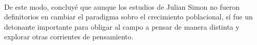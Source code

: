 \documentclass[11pt,spanish,letterpaper]{article}
\theoremstyle{plain}
\begin{document}
\\
De este modo, \cite{ahlburg1998julian} concluy\'e que aunque los estudios de Julian Simon no fueron definitorios en cambiar el paradigma sobro el crecimiento poblacional, s\'i fue un detonante importante para obligar al campo a pensar de manera distinta y explorar otras corrientes de pensamiento.


\end{document}
